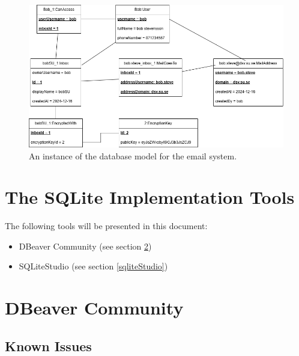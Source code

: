 \documentclass[a4paper,10pt,oneside]{article}
\begin{document}
\begin{figure}[h]
    \centering
    \includegraphics[width=1\textwidth]{images/model/instance.png}
    \caption{An instance of the database model for the email system.}
    \label{fig:instanceDatabaseModel}
\end{figure}

\section{The SQLite Implementation Tools}
\label{sqliteImplementationTools}
The following tools will be presented in this document:
\begin{itemize}
    \item DBeaver Community (see section \ref{dbeaverCommunity})
    \item SQLiteStudio (see section \ref{sqliteStudio})
\end{itemize}

\section{DBeaver Community}
\label{dbeaverCommunity}

\subsection{Known Issues}
\label{dbeaverKnownIssues}
\end{document}
